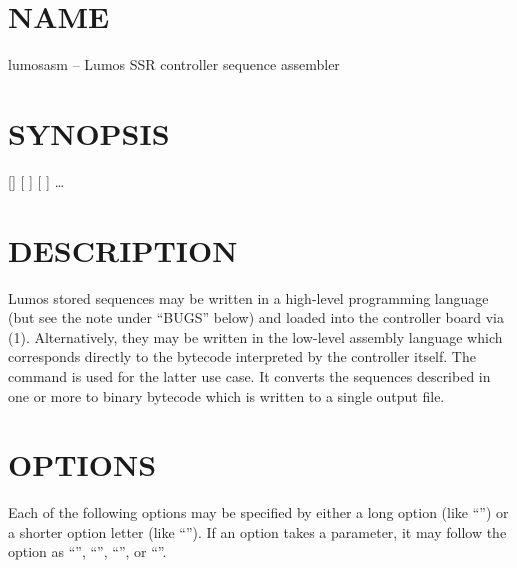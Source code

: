 \section*{NAME}
lumosasm -- Lumos SSR controller sequence assembler
\section*{SYNOPSIS}
[]
[
]
[
]
\dots 
\section*{DESCRIPTION}


Lumos stored sequences may be written in a high-level programming
language (but see the note under ``BUGS'' below) and loaded
into the controller board via
(1).
Alternatively, they may be written in the low-level assembly language
which corresponds directly to the bytecode interpreted by the 
controller itself.  
The
command is used for the latter use case.  It converts the sequences
described in one or more 
to binary bytecode which is written to a single output file.
\section*{OPTIONS}


Each of the following options may be specified by either a long
option (like
``'')
or a shorter option letter (like
``'').
If an option takes a parameter, it may follow the option as
``'',
``'',
``'',
or
``''.


